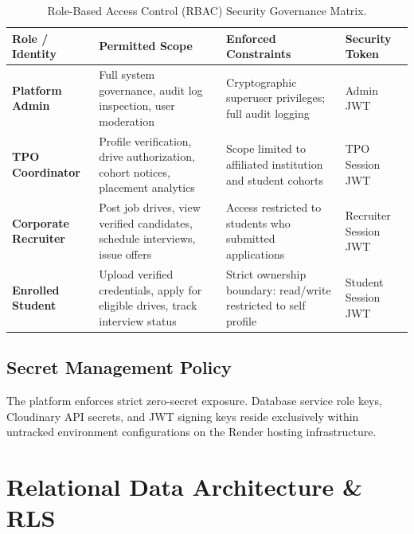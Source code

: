 \documentclass[12pt,a4paper]{report}
\begin{document}
\begin{table}[htbp]
\centering
\small
\begin{tabularx}{\linewidth}{>{\raggedright\arraybackslash\bfseries}p{2.4cm}>{\raggedright\arraybackslash}X>{\raggedright\arraybackslash}X>{\raggedright\arraybackslash}p{2.2cm}}
\toprule
Role / Identity & Permitted Scope & Enforced Constraints & Security Token \\
\midrule
Platform Admin & Full system governance, audit log inspection, user moderation & Cryptographic superuser privileges; full audit logging & Admin JWT \\
\addlinespace
TPO Coordinator & Profile verification, drive authorization, cohort notices, placement analytics & Scope limited to affiliated institution and student cohorts & TPO Session JWT \\
\addlinespace
Corporate Recruiter & Post job drives, view verified candidates, schedule interviews, issue offers & Access restricted to students who submitted applications & Recruiter Session JWT \\
\addlinespace
Enrolled Student & Upload verified credentials, apply for eligible drives, track interview status & Strict ownership boundary: read/write restricted to self profile & Student Session JWT \\
\bottomrule
\end{tabularx}
\caption{Role-Based Access Control (RBAC) Security Governance Matrix.}
\label{tab:rbac}
\end{table}

\section{Secret Management Policy}
The platform enforces strict zero-secret exposure. Database service role keys, Cloudinary API secrets, and JWT signing keys reside exclusively within untracked environment configurations on the Render hosting infrastructure.

\chapter{Relational Data Architecture \& RLS}
\end{document}
